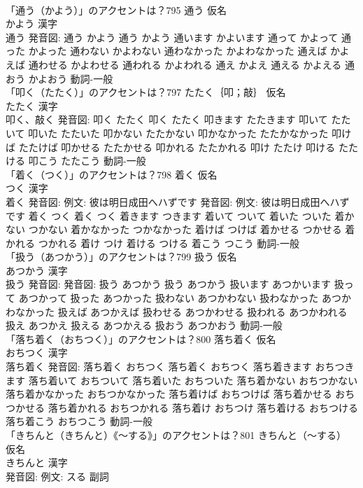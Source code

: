 \documentclass[8pt]{extreport}
\begin{document}
\begin{CJK}{UTF8}{min}
\\	「通う（かよう）」のアクセントは？795	通う 仮名　
\\	かよう 漢字　
\\	通う 発音図:	通う かよう		通う かよう 通います かよいます 通って かよって 通った かよった 通わない かよわない 通わなかった かよわなかった 通えば かよえば 通わせる かよわせる 通われる かよわれる 通え かよえ 通える かよえる 通おう かよおう				動詞-一般 
\\	「叩く（たたく）」のアクセントは？797	たたく｛叩；敲｝ 仮名　
\\	たたく 漢字　
\\	叩く、敲く 発音図:	叩く たたく		叩く たたく 叩きます たたきます 叩いて たたいて 叩いた たたいた 叩かない たたかない 叩かなかった たたかなかった 叩けば たたけば 叩かせる たたかせる 叩かれる たたかれる 叩け たたけ 叩ける たたける 叩こう たたこう				動詞-一般 
\\	「着く（つく）」のアクセントは？798	着く 仮名　
\\	つく 漢字　
\\	着く 発音図: 例文: 彼は明日成田へハずです 発音図: 例文: 彼は明日成田へハずです	着く つく		着く つく 着きます つきます 着いて ついて 着いた ついた 着かない つかない 着かなかった つかなかった 着けば つけば 着かせる つかせる 着かれる つかれる 着け つけ 着ける つける 着こう つこう				動詞-一般 
\\	「扱う（あつかう）」のアクセントは？799	扱う 仮名　
\\	あつかう 漢字　
\\	扱う 発音図: 発音図:	扱う あつかう		扱う あつかう 扱います あつかいます 扱って あつかって 扱った あつかった 扱わない あつかわない 扱わなかった あつかわなかった 扱えば あつかえば 扱わせる あつかわせる 扱われる あつかわれる 扱え あつかえ 扱える あつかえる 扱おう あつかおう				動詞-一般 
\\	「落ち着く（おちつく）」のアクセントは？800	落ち着く 仮名　
\\	おちつく 漢字　
\\	落ち着く 発音図:	落ち着く おちつく		落ち着く おちつく 落ち着きます おちつきます 落ち着いて おちついて 落ち着いた おちついた 落ち着かない おちつかない 落ち着かなかった おちつかなかった 落ち着けば おちつけば 落ち着かせる おちつかせる 落ち着かれる おちつかれる 落ち着け おちつけ 落ち着ける おちつける 落ち着こう おちつこう				動詞-一般 
\\	「きちんと（きちんと）《〜する》」のアクセントは？801	きちんと（〜する） 仮名　
\\	きちんと 漢字　
\\	発音図: 例文: スる							副詞 

\end{CJK}
\end{document}
